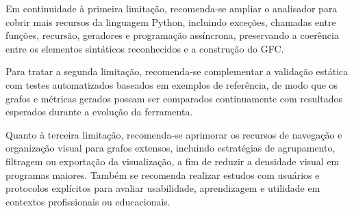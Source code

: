 Em continuidade à primeira limitação, recomenda-se ampliar o analisador para cobrir mais recursos da linguagem Python, incluindo exceções, chamadas entre funções, recursão, geradores e programação assíncrona, preservando a coerência entre os elementos sintáticos reconhecidos e a construção do GFC.

Para tratar a segunda limitação, recomenda-se complementar a validação estática com testes automatizados baseados em exemplos de referência, de modo que os grafos e métricas gerados possam ser comparados continuamente com resultados esperados durante a evolução da ferramenta.

Quanto à terceira limitação, recomenda-se aprimorar os recursos de navegação e organização visual para grafos extensos, incluindo estratégias de agrupamento, filtragem ou exportação da visualização, a fim de reduzir a densidade visual em programas maiores. Também se recomenda realizar estudos com usuários e protocolos explícitos para avaliar usabilidade, aprendizagem e utilidade em contextos profissionais ou educacionais.
